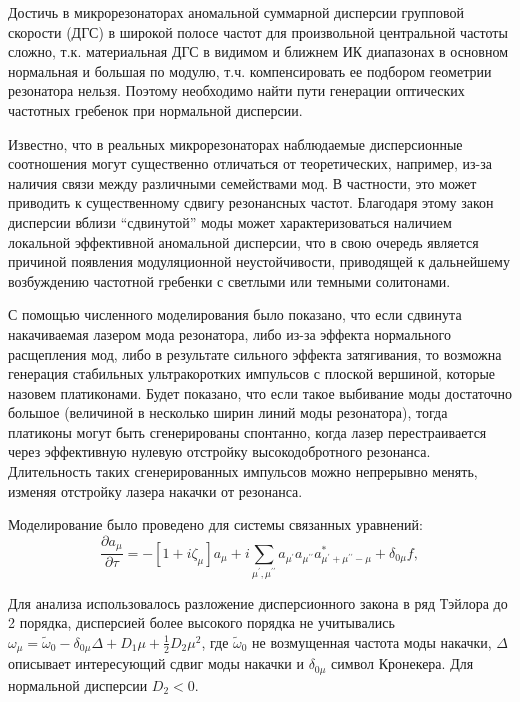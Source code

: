 Достичь в микрорезонаторах аномальной суммарной дисперсии групповой скорости (ДГС) в широкой полосе частот для произвольной центральной частоты сложно, т.к. материальная ДГС в видимом и ближнем ИК диапазонах в основном нормальная и большая по модулю, т.ч. компенсировать ее подбором геометрии резонатора нельзя. Поэтому необходимо найти пути генерации оптических частотных гребенок при нормальной дисперсии.

Известно, что в реальных микрорезонаторах наблюдаемые дисперсионные соотношения могут существенно отличаться от теоретических, например, из-за наличия связи между различными семействами мод. В частности, это может приводить к существенному сдвигу резонансных частот. Благодаря этому закон дисперсии вблизи “сдвинутой” моды может характеризоваться наличием локальной эффективной аномальной дисперсии, что в свою очередь является причиной появления модуляционной неустойчивости, приводящей к дальнейшему возбуждению частотной гребенки с светлыми или темными солитонами.

С помощью численного моделирования было показано, что если сдвинута накачиваемая лазером мода резонатора, либо из-за эффекта нормального расщепления мод, либо в результате сильного эффекта затягивания, то возможна генерация стабильных ультракоротких импульсов с плоской вершиной, которые назовем платиконами. Будет показано, что если такое выбивание моды достаточно большое (величиной в несколько ширин линий моды резонатора), тогда платиконы могут быть сгенерированы спонтанно, когда лазер перестраивается через эффективную нулевую отстройку высокодобротного резонанса. Длительность таких сгенерированных импульсов можно непрерывно менять, изменяя отстройку лазера накачки от резонанса.

Моделирование было проведено для системы связанных уравнений:
%
\begin{equation}
\frac{\partial a_\mu}{\partial \tau}=-[1+i\zeta_{\mu}]a_\mu+i\sum_{\mu^\prime,\mu^{\prime\prime}} a_{\mu^\prime}a_{\mu^{\prime\prime}}a_{\mu^\prime+\mu^{\prime\prime}-\mu}^*+\delta_{0\mu}f,
\end{equation}

Для анализа использовалось разложение дисперсионного закона в ряд Тэйлора до 2 порядка, дисперсией более высокого порядка не учитывались $\omega_\mu=\tilde\omega_0-\delta_{0\mu}\Delta+D_1\mu+\frac{1}{2}D_2\mu^2$,  где $\tilde\omega_0$ не возмущенная частота моды накачки, $\Delta$ описывает интересующий сдвиг моды накачки и $\delta_{0\mu}$ символ Кронекера. Для нормальной дисперсии $D_2<0$.

